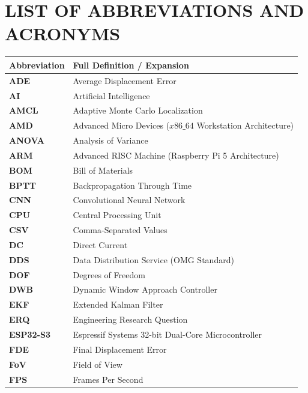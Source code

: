 \chapter*{LIST OF ABBREVIATIONS AND ACRONYMS}

\begin{longtable}{p{3.0cm}p{12.0cm}}
\toprule
\textbf{Abbreviation} & \textbf{Full Definition / Expansion} \\
\midrule
\endhead
\textbf{ADE} & Average Displacement Error \\
\textbf{AI} & Artificial Intelligence \\
\textbf{AMCL} & Adaptive Monte Carlo Localization \\
\textbf{AMD} & Advanced Micro Devices ($x86\_64$ Workstation Architecture) \\
\textbf{ANOVA} & Analysis of Variance \\
\textbf{ARM} & Advanced RISC Machine (Raspberry Pi 5 Architecture) \\
\textbf{BOM} & Bill of Materials \\
\textbf{BPTT} & Backpropagation Through Time \\
\textbf{CNN} & Convolutional Neural Network \\
\textbf{CPU} & Central Processing Unit \\
\textbf{CSV} & Comma-Separated Values \\
\textbf{DC} & Direct Current \\
\textbf{DDS} & Data Distribution Service (OMG Standard) \\
\textbf{DOF} & Degrees of Freedom \\
\textbf{DWB} & Dynamic Window Approach Controller \\
\textbf{EKF} & Extended Kalman Filter \\
\textbf{ERQ} & Engineering Research Question \\
\textbf{ESP32-S3} & Espressif Systems 32-bit Dual-Core Microcontroller \\
\textbf{FDE} & Final Displacement Error \\
\textbf{FoV} & Field of View \\
\textbf{FPS} & Frames Per Second \\

\end{longtable}
